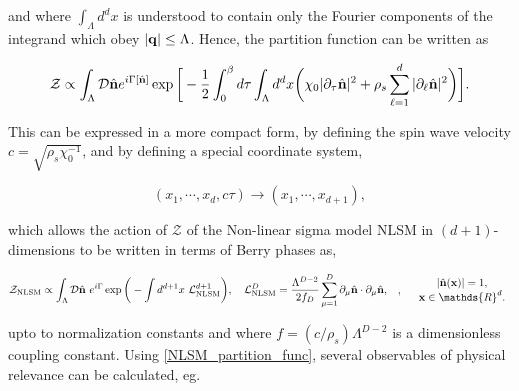 and where $\int_{\Lambda} d^{d} x$ is understood to contain only the Fourier components of the integrand which obey $|{\bf q}| \leq \Lambda$. Hence, the partition function can be written as 

\begin{equation}
    \mathcal{Z} \propto \int_{\Lambda} \mathcal{D} \hat{{\bf n}} e^{i \Gamma[\hat{{\bf n}}]} \exp \bigg[
    -\frac{1}{2} \int_{0}^{\beta} d\tau \int_{\Lambda} d^d x \bigg(
    \chi_0 |\partial_{\tau} \hat{\bf n}|^2 + \rho_s \sum_{\ell = 1}^{d} |\partial_{\ell} \hat{\bf n}|^2
    \bigg)
    \bigg].
\end{equation}

This can be expressed in a more compact form, by defining the spin wave velocity $c = \sqrt{\rho_s \chi_0^{-1}}$, and by defining a special coordinate system,

\begin{equation}
    (x_1, \cdots, x_d, c\tau) \rightarrow (x_1, \cdots, x_{d+1}),
\end{equation}

which allows the action of $\mathcal{Z}$ of the Non-linear sigma model NLSM in $(d+1)$-dimensions to be written in terms of Berry phases as,

\begin{equation}
    \begin{split}
        &\mathcal{Z}_{\textnormal{NLSM}} \propto \int_{\Lambda} \mathcal{D}\hat{{\bf n}} \blanky e^{i\Gamma} \exp \bigg(- \int d^{d+1}x \blanky \mathcal{L}^{d+1}_{\textnormal{NLSM}}\bigg), \quad \mathcal{L}^{D}_{\textnormal{NLSM}} = \frac{\Lambda^{D-2}}{2f_D} \sum_{\mu = 1}^{D} \partial_{\mu} \hat{{\bf n}} \cdot \partial_{\mu} \hat{{\bf n}},
    \end{split}, \quad \begin{array}{cc}
         |\hat{{\bf n}}({\bf x})| = 1,  \\
         {\bf x} \in \mathds{R}^d. 
    \end{array}
        \label{NLSM_partition_func}
\end{equation}

upto to normalization constants and where $f = (c/\rho_s) \Lambda^{D-2}$ is a dimensionless coupling constant. Using \cref{NLSM_partition_func}, several observables of physical relevance can be calculated, eg. 

